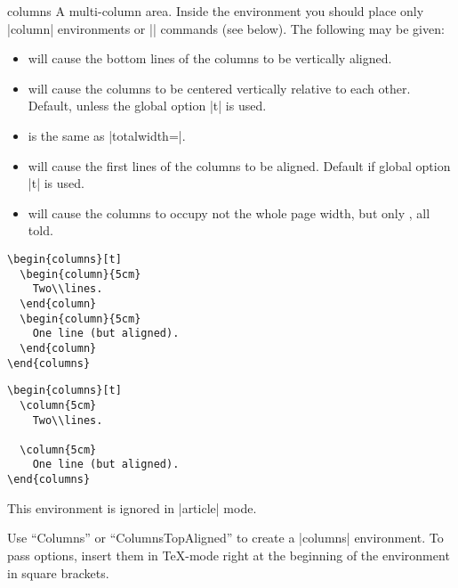 \begin{environment}{{columns}}
  A multi-column area. Inside the environment you should place only
  |column| environments or |\column| commands (see below). The
  following  may be given: 
  \begin{itemize}
  \item
     will cause the bottom lines of the columns to be
    vertically aligned.
  \item
     will cause the columns to be centered vertically
    relative to each other. Default, unless the global option
    |t| is used. 
  \item
     is the same as |totalwidth=\textwidth|.
  \item
     will cause the first lines of the columns to be
    aligned. Default if global option |t| is used.
  \item
     will cause the columns to occupy
    not the whole page width, but only , all told.
  \end{itemize}
    
  \example
\begin{verbatim}
\begin{columns}[t]
  \begin{column}{5cm}
    Two\\lines.
  \end{column}
  \begin{column}{5cm}
    One line (but aligned).
  \end{column}
\end{columns}
\end{verbatim}
  
  \example
\begin{verbatim}
\begin{columns}[t]
  \column{5cm}
    Two\\lines.

  \column{5cm}
    One line (but aligned).
\end{columns}
\end{verbatim}

  \articlenote
  This environment is ignored in |article| mode.
  
  \lyxnote
  Use ``Columns'' or ``ColumnsTopAligned'' to create a |columns|
  environment. To pass options, insert them in \TeX-mode right at the
  beginning of the environment in square brackets.
\end{environment}

